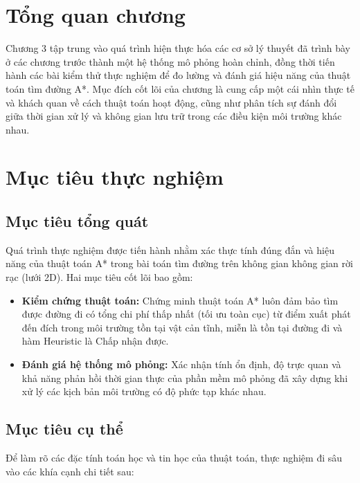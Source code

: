 \documentclass[12pt,a4paper]{report}
\begin{document}
\section*{Tổng quan chương}
Chương 3 tập trung vào quá trình hiện thực hóa các cơ sở lý thuyết đã trình bày ở các chương trước thành một hệ thống mô phỏng hoàn chỉnh, đồng thời tiến hành các bài kiểm thử thực nghiệm để đo lường và đánh giá hiệu năng của thuật toán tìm đường A*. Mục đích cốt lõi của chương là cung cấp một cái nhìn thực tế và khách quan về cách thuật toán hoạt động, cũng như phân tích sự đánh đổi giữa thời gian xử lý và không gian lưu trữ trong các điều kiện môi trường khác nhau.

\section{Mục tiêu thực nghiệm}

\subsection{Mục tiêu tổng quát}
Quá trình thực nghiệm được tiến hành nhằm xác thực tính đúng đắn và hiệu năng của thuật toán A* trong bài toán tìm đường trên không gian không gian rời rạc (lưới 2D). Hai mục tiêu cốt lõi bao gồm:
\begin{itemize}
    \item \textbf{Kiểm chứng thuật toán:} Chứng minh thuật toán A* luôn đảm bảo tìm được đường đi có tổng chi phí thấp nhất (tối ưu toàn cục) từ điểm xuất phát đến đích trong môi trường tồn tại vật cản tĩnh, miễn là tồn tại đường đi và hàm Heuristic là Chấp nhận được.
    \item \textbf{Đánh giá hệ thống mô phỏng:}  Xác nhận tính ổn định, độ trực quan và khả năng phản hồi thời gian thực của phần mềm mô phỏng đã xây dựng khi xử lý các kịch bản môi trường có độ phức tạp khác nhau.
\end{itemize}

\subsection{Mục tiêu cụ thể}
Để làm rõ các đặc tính toán học và tin học của thuật toán, thực nghiệm đi sâu vào các khía cạnh chi tiết sau:
\end{document}
